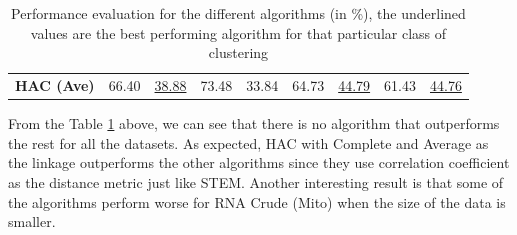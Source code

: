 \begin{table}[H]
\begin{tabular}{lcccccccc}
			\textbf{HAC (Ave)}  & 66.40             & \underline{38.88}            & 73.48                 & 33.84                & 64.73              & \underline{44.79}             & 61.43                 & \underline{44.76}                
	\end{tabular}
	\caption{Performance evaluation for the different algorithms (in \%), the underlined values are the best performing algorithm for that particular class of clustering}
	\label{tab: performance}
\end{table}

From the Table \ref{tab: performance} above, we can see that there is no algorithm that outperforms the rest for all the datasets. As expected, HAC with Complete and Average as the linkage outperforms the other algorithms since they use correlation coefficient as the distance metric just like STEM. Another interesting result is that some of the algorithms perform worse for RNA Crude (Mito) when the size of the data is smaller.